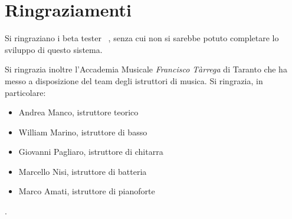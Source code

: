 \chapter*{Ringraziamenti}

Si ringraziano i beta tester %
{\nome\ \emph{\cognome}}, senza cui non si sarebbe potuto completare lo sviluppo di questo sistema.

Si ringrazia inoltre l'Accademia Musicale \textit{Francisco Tàrrega} di Taranto che ha messo a disposizione del team degli istruttori di musica. Si ringrazia, in particolare:
\begin{itemize}
	\item Andrea Manco, istruttore teorico
	\item William Marino, istruttore di basso
	\item Giovanni Pagliaro, istruttore di chitarra
	\item Marcello Nisi, istruttore di batteria
	\item Marco Amati, istruttore di pianoforte
\end{itemize}.